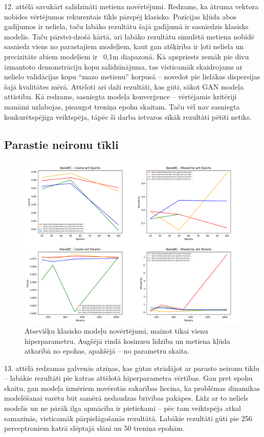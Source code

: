 \documentclass[12pt, a4paper]{article}
\numberwithin{equation}{section} %
\begin{document}
12. attēlā savukārt salīdzināti metiena novērtējumi. Redzams, ka ātruma vektora nobīdes vērtējumos rekurentais tīkls pārspēj klasisko. Pozīcijas kļūda abos gadījumos ir neliela, taču labāko rezultātu šajā gadījumā ir sasniedzis klasisks modelis. Taču pārstei-dzošā kārtā, arī labāko rezultātu simulētā metiena nobīdē sasniedz viens no parastajiem modeļiem, kaut gan atšķirība ir ļoti neliela un precizitāte abiem modeļiem ir ~0,1m diapazonā. Kā apspriests zemāk pie divu izmantoto demonstrāciju kopu salīdzinājuma, tas visticamāk skaidrojams ar nelielo validācijas kopu ``mazo metienu'' korpusā -- novedot pie lielākas dispersijas šajā kvalitātes mērā. Attēloti arī daži rezultāti, kas gūti, sākot GAN modeļa attīstību. Kā redzams, sasniegta modeļa konverģence -- vērtējamie kritēriji manāmi uzlabojas, pieaugot treniņa epohu skaitam. Taču vēl nav sasniegta konkurētspējīga veiktspēja, tāpēc šī darba ietvaros sīkāk rezultāti pētīti netiks. 

\subsection{Parastie neironu tīkli}


\begin{figure}[t!]
    \centering
    \includegraphics[width=16cm,page=1]{../img/naivebc-independent-params-epoch.png}
    \caption{Atsevišķu klasisko modeļu novērtējumi, mainot tikai vienu hiperparametru. Augšējā rindā kosinusu līdzība un metiena kļūda atkarībā no epohas, apakšējā -- no parametru skaita.}
\end{figure}

13. attēlā redzamas galvenās atziņas, kas gūtas strādājot ar parasto neironu tīklu -- labākie rezultāti pie katras attēlotā hiperparametra vērtības. Gan pret epohu skaitu, gan modeļa izmēriem novērotās sakarības liecina, ka problēmas dinamikas modelēšanai varētu būt samērā nedaudzas brīvības pakāpes. Līdz ar to neliels modelis un ne pārāk ilga apmācība ir pietiekami -- pēc tam veiktspēja atkal samazinās, visticamāk pārpielāgošanās rezultātā. Labākie rezultāti gūti pie 256 perceptroniem katrā slēptajā slānī un 50 treniņa epohām. 
\end{document}
